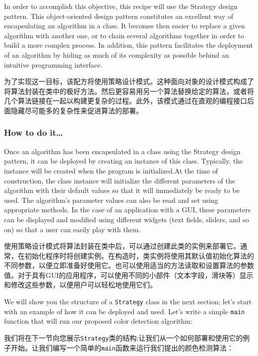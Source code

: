 \documentclass[]{article}
\begin{document}
In order to accomplish this objective, this recipe will use the Strategy
design pattern. This object-oriented design pattern constitutes an
excellent way of encapsulating an algorithm in a class. It becomes then
easier to replace a given algorithm with another one, or to chain
several algorithms together in order to build a more complex process. In
addition, this pattern facilitates the deployment of an algorithm by
hiding as much of its complexity as possible behind an intuitive
programming interface.

为了实现这一目标，该配方将使用策略设计模式。这种面向对象的设计模式构成了将算法封装在类中的极好方法。然后更容易用另一个算法替换给定的算法，或者将几个算法链接在一起以构建更复杂的过程。此外，该模式通过在直观的编程接口后面隐藏尽可能多的复杂性来促进算法的部署。

\hypertarget{header-n1167}{%
\subsubsection{How to do it\ldots{}}\label{header-n1167}}

Once an algorithm has been encapsulated in a class using the Strategy
design pattern, it can be deployed by creating an instance of this
class. Typically, the instance will be created when the program is
initialized.At the time of construction, the class instance will
initialize the different parameters of the algorithm with their default
values so that it will immediately be ready to be used. The algorithm's
parameter values can also be read and set using appropriate methods. In
the case of an application with a GUI, these parameters can be displayed
and modified using different widgets (text fields, sliders, and so on)
so that a user can easily play with them.

使用策略设计模式将算法封装在类中后，可以通过创建此类的实例来部署它。通常，在初始化程序时将创建实例。在构造时，类实例将使用其默认值初始化算法的不同参数，以便立即准备好使用它。也可以使用适当的方法读取和设置算法的参数值。对于具有GUI的应用程序，可以使用不同的小部件（文本字段，滑块等）显示和修改这些参数，以便用户可以轻松地使用它们。

We will show you the structure of a \texttt{Strategy} class in the next
section; let's start with an example of how it can be deployed and used.
Let's write a simple \texttt{main} function that will run our proposed
color detection algorithm:

我们将在下一节向您展示\texttt{Strategy}类的结构;让我们从一个如何部署和使用它的例子开始。让我们编写一个简单的\texttt{main}函数来运行我们提出的颜色检测算法：
\end{document}
